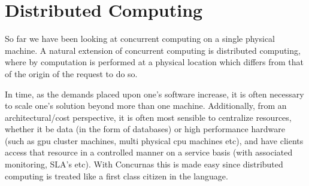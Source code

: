 \documentclass[conc-doc]{subfiles}
\begin{document}
	
	\chapter[Distributed Computing]{Distributed Computing}
	\label{ch:distComp}


So far we have been looking at concurrent computing on a single physical machine. A natural extension of concurrent computing is distributed computing, where by computation is performed at a physical location which differs from that of the origin of the request to do so.

In time, as the demands placed upon one’s software increase, it is often necessary to scale one’s solution beyond more than one machine. Additionally, from an architectural/cost perspective, it is often most sensible to centralize resources, whether it be data (in the form of databases) or high performance hardware (such as gpu cluster machines, multi physical cpu machines etc), and have clients access that resource in a controlled manner on a service basis (with associated monitoring, SLA’s etc). With Concurnas this is made easy since distributed computing is treated like a first class citizen in the language.

\end{document}
